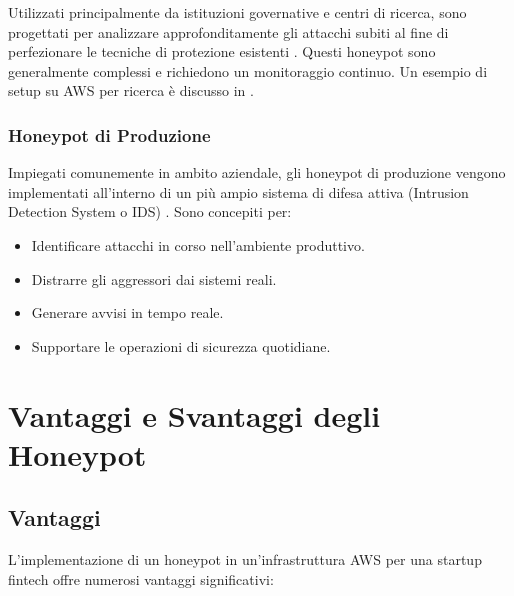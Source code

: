 \documentclass[a4paper,12pt]{report}
\begin{document}
Utilizzati principalmente da istituzioni governative e centri di ricerca, sono progettati per analizzare approfonditamente gli attacchi subiti al fine di perfezionare le tecniche di protezione esistenti \cite{proofpoint2024}. Questi honeypot sono generalmente complessi e richiedono un monitoraggio continuo. Un esempio di setup su AWS per ricerca è discusso in \cite{tsang_2022}.

\subsubsection{Honeypot di Produzione}
\label{subsubsec:produzione}

Impiegati comunemente in ambito aziendale, gli honeypot di produzione vengono implementati all'interno di un più ampio sistema di difesa attiva (Intrusion Detection System o IDS) \cite{proofpoint2024}. Sono concepiti per:
\begin{itemize}
    \item Identificare attacchi in corso nell'ambiente produttivo.
    \item Distrarre gli aggressori dai sistemi reali.
    \item Generare avvisi in tempo reale.
    \item Supportare le operazioni di sicurezza quotidiane.
\end{itemize}

\section{Vantaggi e Svantaggi degli Honeypot}
\label{sec:vantaggi_svantaggi}

\subsection{Vantaggi}
\label{subsec:vantaggi}

L'implementazione di un honeypot in un'infrastruttura AWS per una startup fintech offre numerosi vantaggi significativi:
\end{document}
